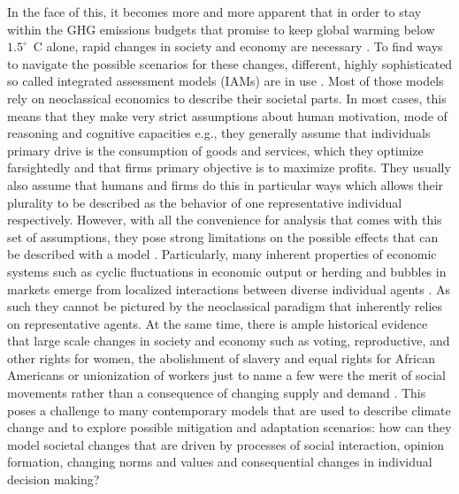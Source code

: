 In the face of this, it becomes more and more apparent that in order to stay within the GHG emissions budgets that promise to keep global warming below $1.5^\circ$~C alone, rapid changes in society and economy are necessary \citep{Rockstrom2017, Geels2017}.
To find ways to navigate the possible scenarios for these changes, different, highly sophisticated so called integrated assessment models (IAMs) are in use \citep{VanVuuren2016}.
Most of those models rely on neoclassical economics to describe their societal parts. In most cases, this means that they make very strict assumptions about human motivation, mode of reasoning and cognitive capacities e.g., they generally assume that individuals primary drive is the consumption of goods and services, which they optimize farsightedly and that firms primary objective is to maximize profits. They usually also assume that humans and firms do this in particular ways which allows their plurality to be described as the behavior of one representative individual respectively.
However, with all the convenience for analysis that comes with this set of assumptions, they pose strong limitations on the possible effects that can be described with a model \citep{Kirman1992}.
Particularly, many inherent properties of economic systems such as cyclic fluctuations in economic output or herding and bubbles in markets emerge from localized interactions between diverse individual agents \citep{Levin1998, Tesfatsion2003, Anderson2018}. As such they cannot be pictured by the neoclassical paradigm that inherently relies on representative agents. 
At the same time, there is ample historical evidence that large scale changes in society and economy such as voting, reproductive, and other rights for women, the abolishment of slavery and equal rights for African Americans or unionization of workers just to name a few were the merit of social movements rather than a consequence of changing supply and demand \citep{Tarrow2011, Tilly2019}. 
This poses a challenge to many contemporary models that are used to describe climate change and to explore possible mitigation and adaptation scenarios: how can they model societal changes that are driven by processes of social interaction, opinion formation, changing norms and values and consequential changes in individual decision making?

